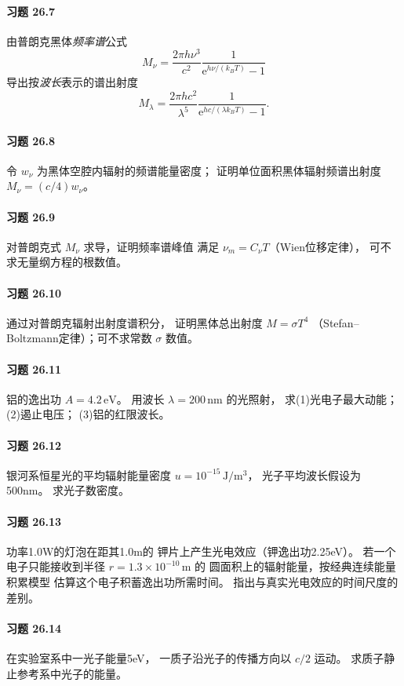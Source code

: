 \paragraph{习题 26.7}
由普朗克黑体\emph{频率谱}公式
\[
M_\nu=\frac{2\pi h\nu^3}{c^2}
\frac{1}{\mathrm e^{h\nu/(k_BT)}-1}
\]
导出按\emph{波长}表示的谱出射度
\[
M_\lambda=\frac{2\pi hc^2}{\lambda^5}
\frac{1}{\mathrm e^{hc/(\lambda k_BT)}-1}.
\]
\paragraph{习题 26.8}
令 \(w_\nu\) 为黑体空腔内辐射的频谱能量密度；
证明单位面积黑体辐射频谱出射度
\(\boxed{M_\nu=(c/4)w_\nu}\)。
\paragraph{习题 26.9}
对普朗克式 \(M_\nu\) 求导，证明频率谱峰值
满足 \(\nu_m=C_\nu T\)（Wien位移定律），
可不求无量纲方程的根数值。
\paragraph{习题 26.10}
通过对普朗克辐射出射度谱积分，
证明黑体总出射度 \(M=\sigma T^4\)
（Stefan--Boltzmann定律）；可不求常数 \(\sigma\) 数值。
\paragraph{习题 26.11}
铝的逸出功 \(A=4.2\,\mathrm{eV}\)。
用波长 \(\lambda=200\,\mathrm{nm}\) 的光照射，
求(1)光电子最大动能；(2)遏止电压；
(3)铝的红限波长。
\paragraph{习题 26.12}
银河系恒星光的平均辐射能量密度
\(u=10^{-15}\,\mathrm{J/m^3}\)，
光子平均波长假设为500nm。
求光子数密度。
\paragraph{习题 26.13}
功率1.0W的灯泡在距其1.0m的
钾片上产生光电效应（钾逸出功2.25eV）。
若一个电子只能接收到半径
\(r=1.3\times10^{-10}\,\mathrm m\) 的
圆面积上的辐射能量，按经典连续能量积累模型
估算这个电子积蓄逸出功所需时间。
指出与真实光电效应的时间尺度的差别。
\paragraph{习题 26.14}
在实验室系中一光子能量5eV，
一质子沿光子的传播方向以 \(c/2\) 运动。
求质子静止参考系中光子的能量。
